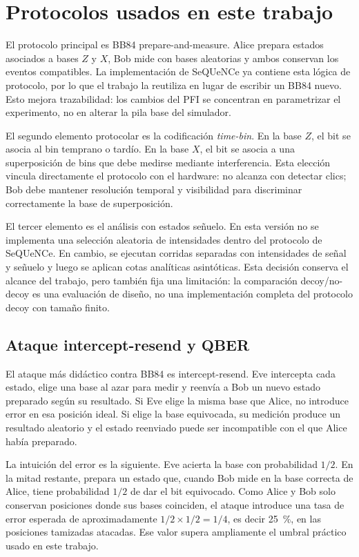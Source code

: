 \section{Protocolos usados en este trabajo}

El protocolo principal es BB84 prepare-and-measure. Alice prepara estados asociados a bases \(Z\) y \(X\), Bob mide con bases aleatorias y ambos conservan los eventos compatibles. La implementación de SeQUeNCe ya contiene esta lógica de protocolo, por lo que el trabajo la reutiliza en lugar de escribir un BB84 nuevo. Esto mejora trazabilidad: los cambios del PFI se concentran en parametrizar el experimento, no en alterar la pila base del simulador.

El segundo elemento protocolar es la codificación \textit{time-bin}. En la base \(Z\), el bit se asocia al bin temprano o tardío. En la base \(X\), el bit se asocia a una superposición de bins que debe medirse mediante interferencia. Esta elección vincula directamente el protocolo con el hardware: no alcanza con detectar clics; Bob debe mantener resolución temporal y visibilidad para discriminar correctamente la base de superposición.

El tercer elemento es el análisis con estados señuelo. En esta versión no se implementa una selección aleatoria de intensidades dentro del protocolo de SeQUeNCe. En cambio, se ejecutan corridas separadas con intensidades de señal y señuelo y luego se aplican cotas analíticas asintóticas. Esta decisión conserva el alcance del trabajo, pero también fija una limitación: la comparación decoy/no-decoy es una evaluación de diseño, no una implementación completa del protocolo decoy con tamaño finito.

\subsection{Ataque intercept-resend y QBER}

El ataque más didáctico contra BB84 es intercept-resend. Eve intercepta cada estado, elige una base al azar para medir y reenvía a Bob un nuevo estado preparado según su resultado. Si Eve elige la misma base que Alice, no introduce error en esa posición ideal. Si elige la base equivocada, su medición produce un resultado aleatorio y el estado reenviado puede ser incompatible con el que Alice había preparado.

La intuición del error es la siguiente. Eve acierta la base con probabilidad \(1/2\). En la mitad restante, prepara un estado que, cuando Bob mide en la base correcta de Alice, tiene probabilidad \(1/2\) de dar el bit equivocado. Como Alice y Bob solo conservan posiciones donde sus bases coinciden, el ataque introduce una tasa de error esperada de aproximadamente \(1/2 \times 1/2 = 1/4\), es decir \SI{25}{\percent}, en las posiciones tamizadas atacadas. Ese valor supera ampliamente el umbral práctico usado en este trabajo.

